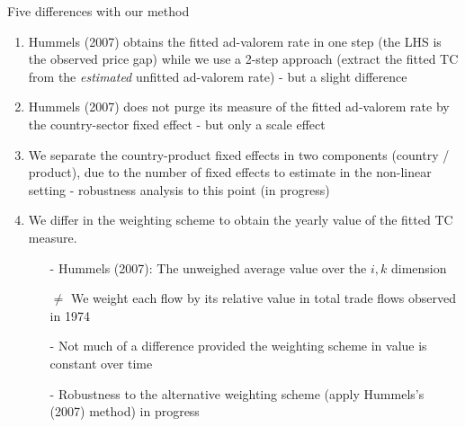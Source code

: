 \documentclass[10 pt,Helvetica, french]{beamer}
\begin{document}
\begin{frame}
Five differences with our method  \vspace{0.1cm}
\footnotesize
\begin{enumerate}

\item Hummels (2007) obtains the fitted ad-valorem rate in one step (the LHS is the observed price gap) while we use a 2-step approach (extract the fitted TC from the \textit{estimated} unfitted ad-valorem rate) - but a slight difference \vspace{0.1cm}
\item Hummels (2007) does not purge its measure of the fitted ad-valorem rate by the country-sector fixed effect  - but only a scale effect \vspace{0.1cm}
\item We separate the country-product fixed effects in two components (country / product), due to the number of fixed effects to estimate in the non-linear setting - robustness analysis to this point (in progress) \vspace{0.1cm}
\item We differ in the weighting scheme to obtain the yearly value of the fitted TC measure.  \vspace{0.1cm}
\begin{itemize}
\footnotesize
\item[-] Hummels (2007): The unweighed average value over the $i,k$ dimension \vspace{0.1cm}
\item[$\neq$] We weight each flow by its relative value in total trade flows observed in 1974 \vspace{0.1cm}
\item[-] Not much of a difference provided the weighting scheme in value is constant over time \vspace{0.1cm}
\item[-] Robustness to the alternative weighting scheme (apply Hummels's (2007) method) in progress
\end{itemize}

\end{enumerate}
\normalsize

\end{frame}
\end{document}
